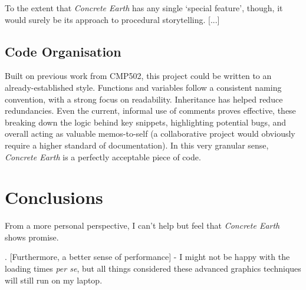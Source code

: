 \documentclass[a4paper, 11pt]{article}
\begin{document}
\begin{flushleft}
\vspace{5pt}\noindent
To the extent that \textit{Concrete Earth} has any single `special feature', though, it would surely be its approach to procedural storytelling. [...]

\subsection{Code Organisation}

Built on previous work from CMP502, this project could be written to an already-established style. Functions and variables follow a consistent naming convention, with a strong focus on readability. Inheritance has helped reduce redundancies. Even the current, informal use of comments proves effective, these breaking down the logic behind key snippets, highlighting potential bugs, and overall acting as valuable memos-to-self (a collaborative project would obviously require a higher standard of documentation). In this very granular sense, \textit{Concrete Earth} is a perfectly acceptable piece of code.

\vspace{5pt}

\vspace{5pt}

\vspace{5pt}

\vspace{5pt}


\section{Conclusions}

From a more personal perspective, I can't help but feel that \textit{Concrete Earth} shows promise.

\vspace{5pt}. [Furthermore, a better sense of performance] - I might not be happy with the loading times \textit{per se}, but all things considered these advanced graphics techniques will still run on my laptop.


\end{flushleft}
\end{document}
